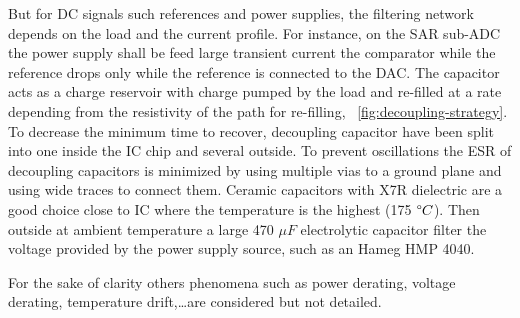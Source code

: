 But for DC signals such references and power supplies, the filtering network depends on the load and the current profile. For instance, on the SAR sub-ADC the power supply shall be feed large transient current the comparator while the reference drops only while the reference is connected to the DAC\@. The capacitor acts as a charge reservoir with charge pumped by the load and re-filled at a rate depending from the resistivity of the path for re-filling, \figurename~\ref{fig:decoupling-strategy}. To decrease the minimum time to recover, decoupling capacitor have been split into one inside the IC chip and several outside. To prevent oscillations the ESR of decoupling capacitors is minimized by using multiple vias to a ground plane and using wide traces to connect them. Ceramic capacitors with X7R dielectric are a good choice close to IC where the temperature is the highest (175 \(\degree C\)). Then outside at ambient temperature a large 470 \(\mu F\) electrolytic capacitor filter the voltage provided by the power supply source, such as an Hameg HMP 4040. 

For the sake of clarity others phenomena such as power derating, voltage derating, temperature drift,\ldots are considered but not detailed.
